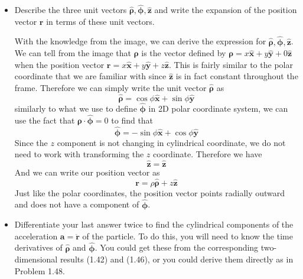 \documentclass[12pt]{article}
\newcommand{\unx}{\hat{\mathbf{x}}}
\newcommand{\uny}{\hat{\mathbf{y}}}
\newcommand{\unz}{\hat{\mathbf{z}}}
\newcommand{\unphi}{\hat{\boldsymbol\phi}}
\newcommand{\unrho}{\hat{\boldsymbol\rho}}
\begin{document}
\begin{enumerate}
\begin{itemize}
            \item[(b)] Describe the three unit vectors \( \unrho, \unphi, \unz \) and write the expansion of the position vector \( \mathbf{r} \) in terms of these unit vectors.

            With the knowledge from the image, we can derive the expression for $\unrho, \unphi, \unz$. We can tell from the image that $\boldsymbol{\rho}$ is the vector defined by $\mathbf{\rho} = x\unx + y\uny + 0\unz$ when the position vector $\mathbf{r} = x\unx + y\uny + z\unz$. This is fairly similar to the polar coordinate that we are familiar with since $\unz$ is in fact constant throughout the frame. Therefore we can simply write the unit vector $\unrho$ as 
            \[
            \unrho = \cos\phi \unx + \sin\phi \uny
            \]
            similarly to what we use to define $\unphi$ in 2D polar coordinate system, we can use the fact that $\unrho \cdot \unphi = 0$ to find that
            \[
            \unphi = -\sin\phi \unx + \cos\phi \uny
            \]
            Since the $z$ component is not changing in cylindrical coordinate, we do not need to work with transforming the $z$ coordinate. Therefore we have
            \[
            \unz = \unz
            \]
            And we can write our position vector as
            \[
            \mathbf{r} = \rho\unrho + z\unz
            \]
            Just like the polar coordinates, the position vector points radially outward and does not have a component of $\unphi$.
            
            \item[(c)] Differentiate your last answer twice to find the cylindrical components of the acceleration \( \mathbf{a} = \ddot{\mathbf{r}} \) of the particle. To do this, you will need to know the time derivatives of \( \unrho \) and \( \unphi \). You could get these from the corresponding two-dimensional results (1.42) and (1.46), or you could derive them directly as in Problem 1.48.


\end{itemize}
\end{enumerate}
\end{document}
